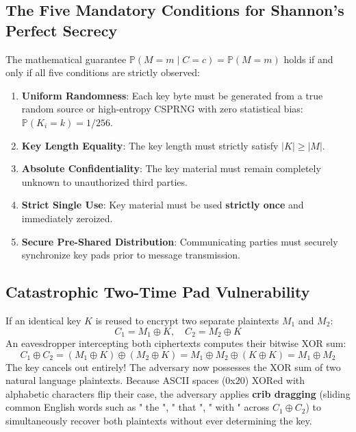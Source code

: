 \documentclass[12pt,a4paper]{report}
\renewcommand{\texttt}[1]{{\normalfont #1}}
\begin{document}
\subsection{The Five Mandatory Conditions for Shannon's Perfect Secrecy}
The mathematical guarantee $\mathbb{P}(M = m \mid C = c) = \mathbb{P}(M = m)$ holds if and only if all five conditions are strictly observed:
\begin{enumerate}
    \item \textbf{Uniform Randomness}: Each key byte must be generated from a true random source or high-entropy CSPRNG with zero statistical bias: $\mathbb{P}(K_i = k) = 1/256$.
    \item \textbf{Key Length Equality}: The key length must strictly satisfy $|K| \ge |M|$.
    \item \textbf{Absolute Confidentiality}: The key material must remain completely unknown to unauthorized third parties.
    \item \textbf{Strict Single Use}: Key material must be used \textbf{strictly once} and immediately zeroized.
    \item \textbf{Secure Pre-Shared Distribution}: Communicating parties must securely synchronize key pads prior to message transmission.
\end{enumerate}

\subsection{Catastrophic Two-Time Pad Vulnerability}
If an identical key $K$ is reused to encrypt two separate plaintexts $M_1$ and $M_2$:
\begin{equation}
    C_1 = M_1 \oplus K, \quad C_2 = M_2 \oplus K
\end{equation}
An eavesdropper intercepting both ciphertexts computes their bitwise XOR sum:
\begin{equation}
    C_1 \oplus C_2 = (M_1 \oplus K) \oplus (M_2 \oplus K) = M_1 \oplus M_2 \oplus (K \oplus K) = M_1 \oplus M_2
\end{equation}
The key cancels out entirely! The adversary now possesses the XOR sum of two natural language plaintexts. Because ASCII spaces (\texttt{0x20}) XORed with alphabetic characters flip their case, the adversary applies \textbf{crib dragging} (sliding common English words such as \texttt{" the "}, \texttt{" that "}, \texttt{" with "} across $C_1 \oplus C_2$) to simultaneously recover both plaintexts without ever determining the key.
\end{document}
